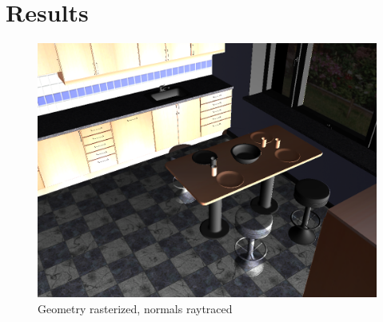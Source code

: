 \section{Results}

\begin{figure}[H]
	\centering
	\includegraphics[width=1.00\textwidth]{Media/hybrid.png}
	\caption{Geometry rasterized, normals raytraced}
	\label{fig:hybrid_image01}
\end{figure}
